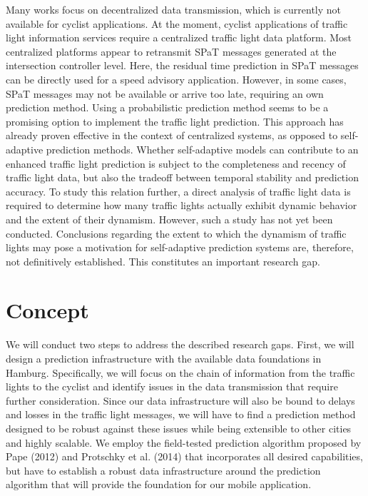 \begin{Summary}
Many works focus on decentralized data transmission, which is currently not available for cyclist applications. At the moment, cyclist applications of traffic light information services require a centralized traffic light data platform. Most centralized platforms appear to retransmit SPaT messages generated at the intersection controller level. Here, the residual time prediction in SPaT messages can be directly used for a speed advisory application. However, in some cases, SPaT messages may not be available or arrive too late, requiring an own prediction method. Using a probabilistic prediction method seems to be a promising option to implement the traffic light prediction. This approach has already proven effective in the context of centralized systems, as opposed to self-adaptive prediction methods. Whether self-adaptive models can contribute to an enhanced traffic light prediction is subject to the completeness and recency of traffic light data, but also the tradeoff between temporal stability and prediction accuracy. To study this relation further, a direct analysis of traffic light data is required to determine how many traffic lights actually exhibit dynamic behavior and the extent of their dynamism. However, such a study has not yet been conducted. Conclusions regarding the extent to which the dynamism of traffic lights may pose a motivation for self-adaptive prediction systems are, therefore, not definitively established. This constitutes an important research gap.
\end{Summary}

\section{Concept}\label{sec:signal-prediction}

We will conduct two steps to address the described research gaps. First, we will design a prediction infrastructure with the available data foundations in Hamburg. Specifically, we will focus on the chain of information from the traffic lights to the cyclist and identify issues in the data transmission that require further consideration. Since our data infrastructure will also be bound to delays and losses in the traffic light messages, we will have to find a prediction method designed to be robust against these issues while being extensible to other cities and highly scalable. We employ the field-tested prediction algorithm proposed by Pape (2012) \cite{pape_untersuchung_2012} and Protschky et al. (2014) \cite{protschky_extensive_2014, protschky_adaptive_2014} that incorporates all desired capabilities, but have to establish a robust data infrastructure around the prediction algorithm that will provide the foundation for our mobile application.

